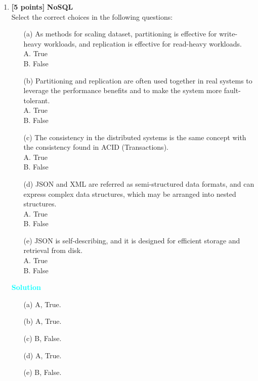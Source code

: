 \documentclass[10pt]{article}
\newenvironment{solution}
    { \begin{mdframed}[backgroundcolor=gray!10] \textcolor{cyan}{\textbf{Solution}} \\}
    {  \end{mdframed}}
\begin{document}
\begin{enumerate}
	\item \textbf{[5 points]} \textbf{NoSQL} \\
	      Select the correct choices in the following questions: \\
	      \begin{itemize}
		      \item[(a)] As methods for scaling dataset, partitioning is effective for write-heavy workloads, and replication is effective for read-heavy workloads.  \\
		            A. True \\
		            B. False
		      \item[(b)] Partitioning and replication are often used together in real systems to leverage the performance
		            benefits and to make the system more fault-tolerant. \\
		            A. True \\
		            B. False
		      \item[(c)] The consistency in the distributed systems is the same concept with the consistency found in ACID (Transactions). \\
		            A. True \\
		            B. False
		      \item[(d)] JSON and XML are referred as semi-structured data formats, and can express complex data structures, which may be arranged into nested structures. \\
		            A. True \\
		            B. False
		      \item[(e)] JSON is self-describing, and it is designed for efficient storage and retrieval from disk. \\
		            A. True \\
		            B. False
	      \end{itemize}
	      \begin{solution}
		      \begin{itemize}
			      \item[(a)] A, True.
			      \item[(b)] A, True.
			      \item[(c)] B, False.
			      \item[(d)] A, True.
			      \item[(e)] B, False.
		      \end{itemize}
	      \end{solution}

\end{enumerate}
\end{document}
